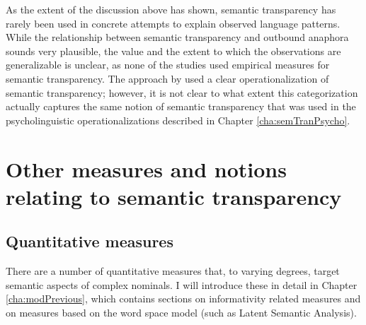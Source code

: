 As the extent of the discussion above has shown, semantic transparency
has rarely been used in concrete attempts to explain observed language
patterns. While the relationship between semantic transparency and
outbound anaphora sounds very plausible, the value and the extent to
which the observations are generalizable is unclear, as none of the studies used
empirical measures for semantic transparency. The approach by
\citet{Bell:2012} used a clear operationalization of semantic
transparency; however, it is not clear to what extent this categorization
actually captures the same notion of semantic transparency that was
used in the psycholinguistic operationalizations described in Chapter \ref{cha:semTranPsycho}.

\section[Other measures and notions]{Other measures and notions relating to semantic transparency}
\label{sec:other_measures_and_notions}

\subsection{Quantitative measures}
\label{sec:quantitative_measures}

There are a number of quantitative measures that, to varying degrees,
target semantic aspects of complex nominals. I will introduce these
in detail in Chapter \ref{cha:modPrevious}, which contains sections on
informativity related measures and on measures based on the word space
model (such as Latent Semantic Analysis). 








